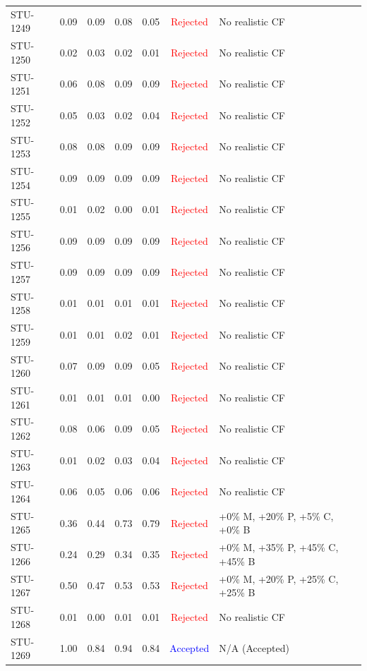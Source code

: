 \begin{longtable}{l c c c c | c | l}
STU-1249 & 0.09 & 0.09 & 0.08 & 0.05 & \textcolor{red}{Rejected} & No realistic CF \\
STU-1250 & 0.02 & 0.03 & 0.02 & 0.01 & \textcolor{red}{Rejected} & No realistic CF \\
STU-1251 & 0.06 & 0.08 & 0.09 & 0.09 & \textcolor{red}{Rejected} & No realistic CF \\
STU-1252 & 0.05 & 0.03 & 0.02 & 0.04 & \textcolor{red}{Rejected} & No realistic CF \\
STU-1253 & 0.08 & 0.08 & 0.09 & 0.09 & \textcolor{red}{Rejected} & No realistic CF \\
STU-1254 & 0.09 & 0.09 & 0.09 & 0.09 & \textcolor{red}{Rejected} & No realistic CF \\
STU-1255 & 0.01 & 0.02 & 0.00 & 0.01 & \textcolor{red}{Rejected} & No realistic CF \\
STU-1256 & 0.09 & 0.09 & 0.09 & 0.09 & \textcolor{red}{Rejected} & No realistic CF \\
STU-1257 & 0.09 & 0.09 & 0.09 & 0.09 & \textcolor{red}{Rejected} & No realistic CF \\
STU-1258 & 0.01 & 0.01 & 0.01 & 0.01 & \textcolor{red}{Rejected} & No realistic CF \\
STU-1259 & 0.01 & 0.01 & 0.02 & 0.01 & \textcolor{red}{Rejected} & No realistic CF \\
STU-1260 & 0.07 & 0.09 & 0.09 & 0.05 & \textcolor{red}{Rejected} & No realistic CF \\
STU-1261 & 0.01 & 0.01 & 0.01 & 0.00 & \textcolor{red}{Rejected} & No realistic CF \\
STU-1262 & 0.08 & 0.06 & 0.09 & 0.05 & \textcolor{red}{Rejected} & No realistic CF \\
STU-1263 & 0.01 & 0.02 & 0.03 & 0.04 & \textcolor{red}{Rejected} & No realistic CF \\
STU-1264 & 0.06 & 0.05 & 0.06 & 0.06 & \textcolor{red}{Rejected} & No realistic CF \\
STU-1265 & 0.36 & 0.44 & 0.73 & 0.79 & \textcolor{red}{Rejected} & +0\% M, +20\% P, +5\% C, +0\% B \\
STU-1266 & 0.24 & 0.29 & 0.34 & 0.35 & \textcolor{red}{Rejected} & +0\% M, +35\% P, +45\% C, +45\% B \\
STU-1267 & 0.50 & 0.47 & 0.53 & 0.53 & \textcolor{red}{Rejected} & +0\% M, +20\% P, +25\% C, +25\% B \\
STU-1268 & 0.01 & 0.00 & 0.01 & 0.01 & \textcolor{red}{Rejected} & No realistic CF \\
STU-1269 & 1.00 & 0.84 & 0.94 & 0.84 & \textcolor{blue}{Accepted} & N/A (Accepted) \\

\end{longtable}
